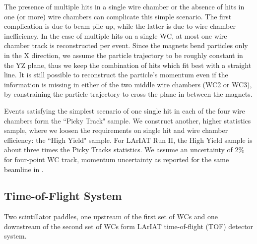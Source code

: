 The presence of multiple hits in a single wire chamber or the absence of hits in one (or more) wire chambers can complicate this simple scenario. The first complication is due to beam pile up, while the latter is due to wire chamber inefficiency. In the case of multiple hits on a single WC, at most one wire chamber track is reconstructed per event. Since the magnets bend particles only in the X direction, we assume the particle trajectory to be roughly constant in the YZ plane, thus we keep the combination of hits which fit best with a straight line. 
It is still possible to reconstruct the particle's momentum  even if the information is missing in either of the two middle wire chambers (WC2 or WC3), by constraining the particle trajectory to cross the plane in between the magnets. 

Events satisfying the simplest scenario of one single hit in each of the four wire chambers form the ``Picky Track" sample.  We construct another, higher statistics sample, where we loosen the requirements on single hit and wire chamber efficiency: the ``High Yield" sample. For LArIAT Run II, the High Yield sample is about three times the Picky Tracks statistics.  
We assume an uncertainty of 2\% for four-point WC track, momentum uncertainty as reported for the same beamline in \cite{MinervaTestbeam}.





\subsection{Time-of-Flight System}\label{sec:TOF}
Two scintillator paddles, one upstream of the first set of WCs and one downstream of the second set of WCs  form LArIAT  time-of-flight (TOF) detector system. 

